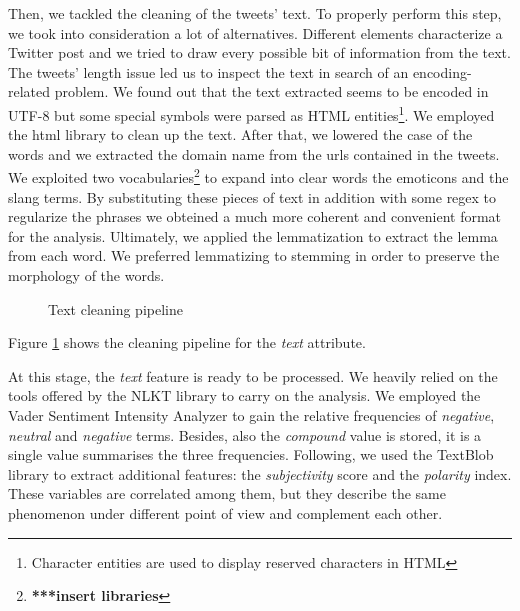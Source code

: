 \documentclass[conference]{IEEEtran}
\begin{document}
Then, we tackled the cleaning of the tweets' text. To properly perform this step, we took into consideration a lot of alternatives. Different elements characterize a Twitter post and we tried to draw every possible bit of information from the text. The tweets' length issue led us to inspect the text in search of an encoding-related problem. We found out that the text extracted seems to be encoded in UTF-8\cite{utf8} but some special symbols were parsed as HTML entities\footnote{Character entities are used to display reserved characters in HTML}. We employed the html library to clean up the text. After that, we lowered the case of the words and we extracted the domain name from the urls contained in the tweets. We exploited two vocabularies\footnote{\textbf{***insert libraries}} to expand into clear words the emoticons and the slang terms. By substituting these pieces of text in addition with some regex to regularize the phrases we obteined a much more coherent and convenient format for the analysis. Ultimately, we applied the lemmatization\cite{lemmatization} to extract the lemma from each word. We preferred lemmatizing to stemming\cite{stemming} in order to preserve the morphology of the words\cite{stemmingVSlemmatizing}.
\begin{figure}[h]
        \centering
        
        \caption{Text cleaning pipeline}
        \label{fig:cleaning_schema}
\end{figure}
Figure \ref{fig:cleaning_schema} shows the cleaning pipeline for the \textit{text} attribute.

At this stage, the \textit{text} feature is ready to be processed. We heavily relied on the tools offered by the NLKT library\cite{nlkt} to carry on the analysis. We employed the Vader Sentiment Intensity Analyzer\cite{vader} to gain the relative frequencies of \textit{negative}, \textit{neutral} and \textit{negative} terms. Besides, also the \textit{compound} value is stored, it is a single value summarises the three frequencies. Following, we used the TextBlob library\cite{textblob} to extract additional features: the \textit{subjectivity} score and the \textit{polarity} index. These variables are correlated among them, but they describe the same phenomenon under different point of view and complement each other.
\end{document}
